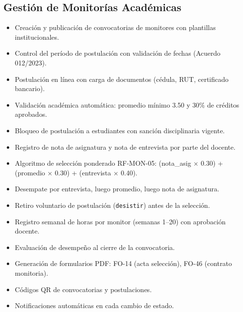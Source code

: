 \documentclass[12pt,a4paper]{article}
\begin{document}
\subsection{Gestión de Monitorías Académicas}
\begin{itemize}[leftmargin=1.5cm]
  \item Creación y publicación de convocatorias de monitores con plantillas institucionales.
  \item Control del período de postulación con validación de fechas (Acuerdo 012/2023).
  \item Postulación en línea con carga de documentos (cédula, RUT, certificado bancario).
  \item Validación académica automática: promedio mínimo 3.50 y 30\% de créditos aprobados.
  \item Bloqueo de postulación a estudiantes con sanción disciplinaria vigente.
  \item Registro de nota de asignatura y nota de entrevista por parte del docente.
  \item Algoritmo de selección ponderado RF-MON-05: (nota\_asig × 0.30) + (promedio × 0.30) + (entrevista × 0.40).
  \item Desempate por entrevista, luego promedio, luego nota de asignatura.
  \item Retiro voluntario de postulación (\texttt{desistir}) antes de la selección.
  \item Registro semanal de horas por monitor (semanas 1--20) con aprobación docente.
  \item Evaluación de desempeño al cierre de la convocatoria.
  \item Generación de formularios PDF: FO-14 (acta selección), FO-46 (contrato monitoria).
  \item Códigos QR de convocatorias y postulaciones.
  \item Notificaciones automáticas en cada cambio de estado.
\end{itemize}
\end{document}
